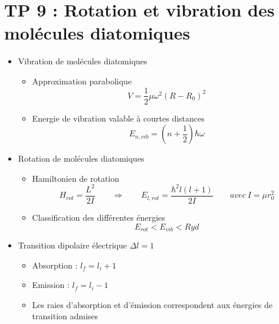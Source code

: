 
\section*{TP 9 : Rotation et vibration des molécules diatomiques}
\begin{itemize}
		
	\item Vibration de molécules diatomiques
	      \begin{itemize}
	      				
	      	\item Approximation parabolique 
	      	      \begin{equation}
	      	      	V = \frac{1}{2}\mu \omega ^2 (R-R_0)^2
	      	      \end{equation}
	      	      					
	      	\item Energie de vibration valable à courtes distances 
	      	      \begin{equation}
	      	      	E_{n,vib} = (n+\frac{1}{2})\hbar \omega
	      	      \end{equation}
	      \end{itemize}
	      		
	\item Rotation de molécules diatomiques
	      			
	      \begin{itemize}
	      	\item Hamiltonien de rotation
	      	      \begin{equation}
	      	      	H_{rot} = \frac{L^2}{2I} \qquad \Rightarrow \qquad E_{l,rot} = \frac{\hbar ^2 l(l+1)}{2I} \qquad avec \ I = \mu r_0 ^2
	      	      \end{equation}
	      	      				
	      	\item Classification des différentes énergies
	      	      \begin{equation}
	      	      	E_{rot} < E_{vib} < Ryd
	      	      \end{equation}
	      \end{itemize}
	      			
	\item Transition dipolaire électrique $\Delta l = 1$
	      
	      \begin{itemize}
	      	\item Absorption : $l_f = l_i + 1$
	      	\item Emission : $l_f = l_i - 1$
	      	\item Les raies d'absorption et d'émission correspondent aux énergies de transition admises
	      \end{itemize}
\end{itemize}

